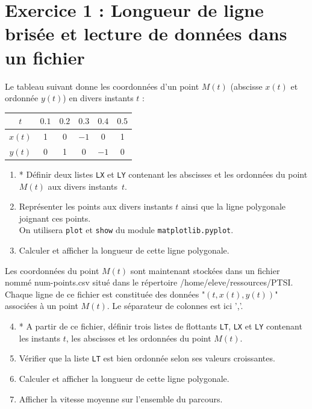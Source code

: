 \section*{Exercice 1 : Longueur de ligne brisée et lecture de données dans un fichier}
Le tableau suivant donne les coordonnées d'un point $M(t)$ (abscisse $x(t)$ et ordonnée $y(t)$) en divers instants $t$ :
\begin{center}
\begin{tabular}{|c||c|c|c|c|c|}
\hline
$t$ & $0.1$ & $0.2$ & $0.3$ & $0.4$ & $0.5$ \\
\hline
$x(t)$ & 1 & 0 & $-1$ & 0 & 1 \\
\hline
$y(t)$ & 0 & 1 & 0 & $-1$ & 0 \\
\hline
\end{tabular}
\end{center}
\begin{enumerate}
\item * Définir deux listes \texttt{LX} et \texttt{LY} contenant les abscisses et les ordonnées du point $M(t)$ aux divers instants~$t$.
\item Représenter les points aux divers instants $t$ ainsi que la ligne polygonale joignant ces points. \\
On utilisera \texttt{plot} et \texttt{show} du module \texttt{matplotlib.pyplot}.
\item Calculer et afficher la longueur de cette ligne polygonale.
\end{enumerate}
Les coordonnées du point $M(t)$ sont maintenant stockées dans un fichier nommé num-points.csv situé dans le répertoire /home/eleve/ressources/PTSI. Chaque ligne de ce fichier est constituée des données "$(t, x(t),y(t))$" associées à un point $M(t)$. Le séparateur de colonnes est ici ','.
\begin{enumerate}
\setcounter{enumi}{3}
\item * A partir de ce fichier, définir trois listes de flottants \texttt{LT}, \texttt{LX} et \texttt{LY} contenant les instants $t$, les abscisses et les ordonnées du point $M(t)$.
\item Vérifier que la liste \texttt{LT} est bien ordonnée selon ses valeurs croissantes.
\item Calculer et afficher la longueur de cette ligne polygonale.
\item Afficher la vitesse moyenne sur l'ensemble du parcours.
\end{enumerate}




